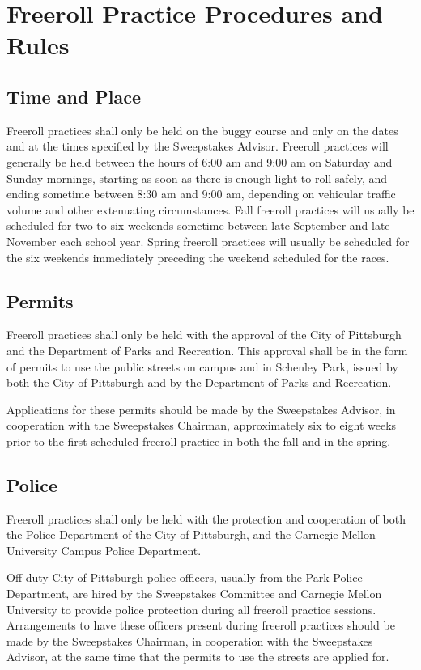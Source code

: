 \section{Freeroll Practice Procedures and Rules}

\subsection{Time and Place}

Freeroll practices shall only be held on the buggy course and only on the dates and at the times specified by the Sweepstakes Advisor. Freeroll practices will generally be held between the hours of 6:00 am and 9:00 am on Saturday and Sunday mornings, starting as soon as there is enough light to roll safely, and ending sometime between 8:30 am and 9:00 am, depending on vehicular traffic volume and other extenuating circumstances. Fall freeroll practices will usually be scheduled for two to six weekends sometime between late September and late November each school year. Spring freeroll practices will usually be scheduled for the six weekends immediately preceding the weekend scheduled for the races.

\subsection{Permits}

Freeroll practices shall only be held with the approval of the City of Pittsburgh and the Department of Parks and Recreation. This approval shall be in the form of permits to use the public streets on campus and in Schenley Park, issued by both the City of Pittsburgh and by the Department of Parks and Recreation.

Applications for these permits should be made by the Sweepstakes Advisor, in cooperation with the Sweepstakes Chairman, approximately six to eight weeks prior to the first scheduled freeroll practice in both the fall and in the spring.

\subsection{Police}

Freeroll practices shall only be held with the protection and cooperation of both the Police Department of the City of Pittsburgh, and the Carnegie Mellon University Campus Police Department.

Off-duty City of Pittsburgh police officers, usually from the Park Police Department, are hired by the Sweepstakes Committee and Carnegie Mellon University to provide police protection during all freeroll practice sessions. Arrangements to have these officers present during freeroll practices should be made by the Sweepstakes Chairman, in cooperation with the Sweepstakes Advisor, at the same time that the permits to use the streets are applied for.


